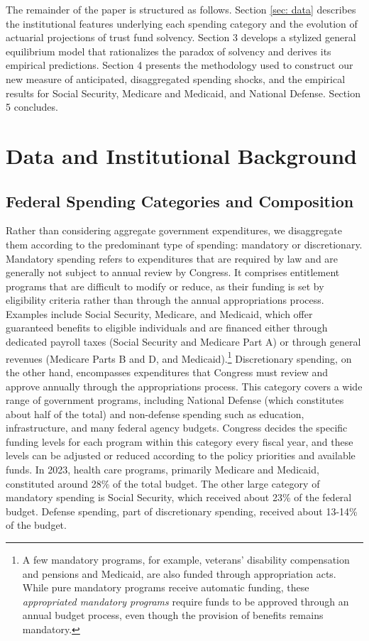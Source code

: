 \documentclass[12pt]{article}%
\theoremstyle{remark}
\begin{document}
The remainder of the paper is structured as follows. Section \ref{sec: data} describes the institutional features underlying each spending category and the evolution of actuarial projections of trust fund solvency. Section 3 develops a stylized general equilibrium model that rationalizes the paradox of solvency and derives its empirical predictions. Section 4 presents the methodology used to construct our new measure of anticipated, disaggregated spending shocks, and the empirical results for Social Security, Medicare and Medicaid, and National Defense. Section 5 concludes.


\section{Data and Institutional Background\label{sec: data}}\label{sec:background}
\subsection{Federal Spending Categories and Composition} 
Rather than considering aggregate government expenditures, we disaggregate them according to the predominant type of spending: mandatory or discretionary. Mandatory spending refers to expenditures that are required by law and are generally not subject to annual review by Congress. It comprises entitlement programs that are difficult to modify or reduce, as their funding is set by eligibility criteria rather than through the annual appropriations process. Examples include Social Security, Medicare, and Medicaid, which offer guaranteed benefits to eligible individuals and are financed either through dedicated payroll taxes (Social Security and Medicare Part A) or through general revenues (Medicare Parts B and D, and Medicaid).\footnote{A few mandatory programs, for example, veterans' disability compensation and pensions and Medicaid, are also funded through appropriation acts. While pure mandatory programs receive automatic funding, these \textit{appropriated mandatory programs} require funds to be approved through an annual budget process, even though the provision of benefits remains mandatory.} Discretionary spending, on the other hand, encompasses expenditures that Congress must review and approve annually through the appropriations process. This category covers a wide range of government programs, including National Defense (which constitutes about half of the total) and non-defense spending such as education, infrastructure, and many federal agency budgets. Congress decides the specific funding levels for each program within this category every fiscal year, and these levels can be adjusted or reduced according to the policy priorities and available funds. In 2023, health care programs, primarily Medicare and Medicaid, constituted around 28\% of the total budget. The other large category of mandatory spending is Social Security, which received about 23\% of the federal budget. Defense spending, part of discretionary spending, received about 13-14\% of the budget. 
 
\end{document}
